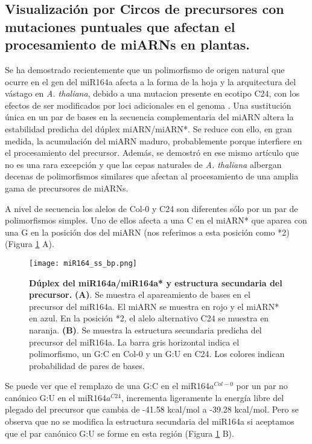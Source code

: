 \subsection{Visualización por Circos de precursores con mutaciones puntuales que afectan el procesamiento de miARNs en plantas.}

Se ha demostrado recientemente que un polimorfismo de origen natural que ocurre en el gen del miR164a afecta a la forma de la hoja y la arquitectura del vástago en \textit{A. thaliana}, debido a una mutacion presente en ecotipo C24, con los efectos de ser modificados por loci adicionales en el genoma \citep{pmid22206705}.
Una sustitución única en un par de bases en la secuencia complementaria del miARN altera la estabilidad predicha del dúplex miARN/miARN*.
Se reduce con ello, en gran medida, la acumulación del miARN maduro, probablemente porque interfiere en el procesamiento del precursor.
Además, se demostró en ese mismo artículo que no es una rara excepción y que las cepas naturales de \textit{A. thaliana} albergan decenas de polimorfismos similares que afectan al procesamiento de una amplia gama de precursores de miARNs.

A nivel de secuencia los alelos de Col-0 y C24 son diferentes sólo por un par de polimorfismos simples.
Uno de ellos afecta a una C en el miARN* que aparea con una G en la posición dos del miARN (nos referimos a esta posición como *2) (Figura \ref{fig:miR164_ss_bp} A).

\begin{figure}[htbp!] 
	\centering    
	\texttt{[image: miR164\_ss\_bp.png]}
	\caption[Dúplex del miR164a/miR164a* y estructura secundaria del precursor]{
		\textbf{Dúplex del miR164a/miR164a* y estructura secundaria del precursor.}
		\textbf{(A)}. Se muestra el apareamiento de bases en el precursor del miR164a.
		El miARN se muestra en rojo y el miARN* en azul.
		En la posición *2, el alelo alternativo C24 se muestra en naranja.
		\textbf{(B)}. Se muestra la estructura secundaria predicha del precursor del miR164a.
		La barra gris horizontal indica el polimorfismo, un G:C en Col-0 y un G:U en C24.
		Los colores indican probabilidad de pares de bases.
	}
	\label{fig:miR164_ss_bp}
\end{figure}

Se puede ver que el remplazo de una G:C en el miR164$a^{Col-0}$ por un par no canónico G:U en el miR164$a^{C24}$, incrementa ligeramente la energía libre del plegado del precursor que cambia de -41.58 kcal/mol a -39.28 kcal/mol.
Pero se observa que no se modifica la estructura secundaria del miR164a si aceptamos que el par canónico G:U se forme en esta región (Figura \ref{fig:miR164_ss_bp} B). 

